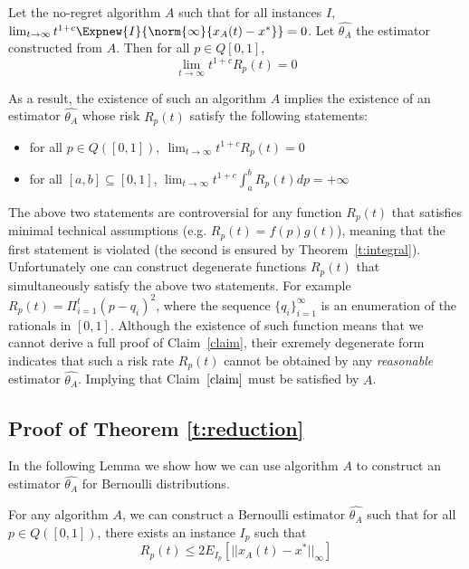\begin{theorem}\label{t:reduction}
Let the no-regret algorithm $A$ such that for all instances $I$, $\lim_{t \rightarrow \infty} t^{1+c} \Expnew{I}{\norm{\infty}{x_A(t)-x^*}}=0$.
Let $\hat{\theta_A}$ the estimator constructed from $A$. Then for all  $p \in Q[0,1]$, \[\lim_{t \rightarrow \infty}t^{1+c}R_p(t)=0\]
\end{theorem}

\noindent As a result, the existence of such an algorithm $A$ implies the existence of an estimator $\hat{\theta_A}$
whose risk $R_p(t)$ satisfy the following statements:

\begin{itemize}
 \item for all $p \in Q([0,1]),~ \lim_{t \rightarrow \infty}t^{1+c}R_p(t)=0$
 \item for all $[a,b] \subseteq [0,1]$, $\lim_{t \to \infty}t^{1+c} \int_{a}^{b}R_p(t)dp = +\infty$
\end{itemize}


The above two statements are controversial for any function $R_p(t)$ that satisfies minimal technical 
assumptions (e.g. $R_p(t)=f(p)g(t)$), meaning that the first statement is violated (the second is ensured 
by Theorem~\ref{t:integral}). Unfortunately one can construct degenerate functions $R_p(t)$ 
that simultaneously satisfy the above two statements. For example $R_p(t)=\Pi_{i=1}^t(p-q_i)^2$, 
where the sequence $\{q_i\}_{i=1}^{\infty}$ is an enumeration of the rationals in $[0,1]$. Although
the existence of such function means that we cannot derive a full proof of Claim~\ref{claim}, their
exremely degenerate form indicates that such a risk rate $R_p(t)$ cannot be obtained by any 
\emph{reasonable} estimator $\hat{\theta_A}$. Implying that Claim~$\ref{claim}$ must be satisfied by 
$A$.

\subsection{Proof of Theorem \ref{t:reduction}}
\noindent In the following Lemma we show how we can use algorithm $A$ to construct an estimator $\hat{\theta_A}$ for Bernoulli distributions.
\begin{lemma}\label{l:reduction}
For any algorithm $A$, we can construct a Bernoulli estimator $\hat{\theta_A}$ such that for all $p \in Q([0,1])$, there exists an instance $I_p$ such that $$R_p(t) \leq 2E_{I_p}[||x_A(t)-x^*||_{\infty}]$$
\end{lemma}

